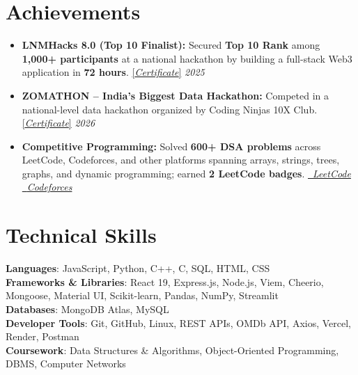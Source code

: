 \documentclass[a4paper,10pt]{article}
\newcommand{\porItemListStart}{%
  \begin{itemize}[leftmargin=4ex, rightmargin=0ex, noitemsep, labelsep=1.5mm, itemsep=1pt,
    label={\small$\bullet$}]\small}
\newcommand{\porItemListEnd}{\end{itemize}\vspace{1.5mm}}
\begin{document}
\vspace{-5mm}
\section{\textbf{Achievements}}
\vspace{1pt}
\porItemListStart
  \item \textbf{LNMHacks 8.0 (Top 10 Finalist):} Secured \textbf{Top 10 Rank} among \textbf{1,000+ participants} at a national hackathon by building a full-stack Web3 application in \textbf{72 hours}. \href{https://drive.google.com/file/d/1K_A-ARDNiVYWjJ_M1hUa628TLpgoYoWm/view?usp=drive_link}{\small[\textit{Certificate}]} \hfill \textit{\small{2025}}
  \item \textbf{ZOMATHON -- India's Biggest Data Hackathon:} Competed in a national-level data hackathon organized by Coding Ninjas 10X Club. \href{https://drive.google.com/file/d/1lwamWDtC9PTlQ9paRJY5Xzi8hSA8KXTg/view?usp=drive_link}{\small[\textit{Certificate}]} \hfill \textit{\small{2026}}
  \item \textbf{Competitive Programming:} Solved \textbf{600+ DSA problems} across LeetCode, Codeforces, and other platforms spanning arrays, strings, trees, graphs, and dynamic programming; earned \textbf{2 LeetCode badges}. \quad \href{https://leetcode.com/u/brijwashi_/}{\faCode\ \textit{LeetCode}} \quad \href{https://codeforces.com/profile/radha_krishna_pk}{\faCode\ \textit{Codeforces}}
\porItemListEnd
\vspace{-4mm}


\section{\textbf{Technical Skills}}
\vspace{2pt}
 \begin{itemize}[leftmargin=0.05in, label={}]
    \small{\item{
     \textbf{Languages}{: JavaScript, Python, C++, C, SQL, HTML, CSS} \\[1pt]
     \textbf{Frameworks \& Libraries}{: React 19, Express.js, Node.js, Viem, Cheerio, Mongoose, Material UI, Scikit-learn, Pandas, NumPy, Streamlit} \\[1pt]
     \textbf{Databases}{: MongoDB Atlas, MySQL} \\[1pt]
     \textbf{Developer Tools}{: Git, GitHub, Linux, REST APIs, OMDb API, Axios, Vercel, Render, Postman} \\[1pt]
     \textbf{Coursework}{: Data Structures \& Algorithms, Object-Oriented Programming, DBMS, Computer Networks}
    }}
 \end{itemize}
 \vspace{-12pt}
\end{document}
